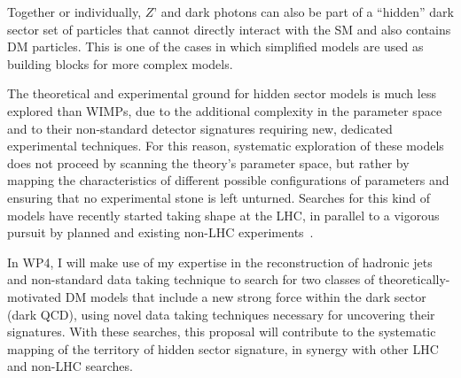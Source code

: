 Together or individually, $Z’$ and dark photons can also be part of a “hidden” dark sector set of particles that cannot directly interact with the SM and also contains DM particles. This is one of the cases in which simplified models are used as building blocks for more complex models.

The theoretical and experimental ground for hidden sector models is much less explored than WIMPs, due to the additional complexity in the parameter space and to their non-standard detector signatures requiring new, dedicated experimental techniques. 
For this reason, systematic exploration of these models does not proceed by scanning the theory’s parameter space, but rather by mapping the characteristics of different possible configurations of parameters and ensuring that no experimental stone is left unturned. 
Searches for this kind of models have recently started taking shape at the LHC, in parallel to a vigorous pursuit by planned and existing non-LHC experiments~\cite{PBC}. 

In WP4, I will make use of my expertise in the reconstruction of hadronic jets and non-standard data taking technique to search for two classes of theoretically-motivated DM models that include a new strong force within the dark sector (dark QCD), using novel data taking techniques necessary for uncovering their signatures. 
With these searches, this proposal will contribute to the systematic mapping of the territory of hidden sector signature, in synergy with other LHC and non-LHC searches. 






